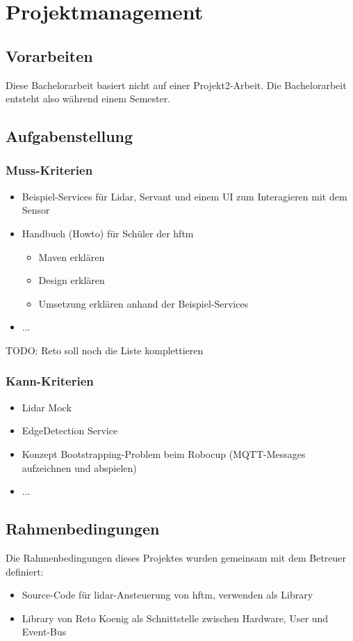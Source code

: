 \chapter{Projektmanagement}
\section{Vorarbeiten}
Diese Bachelorarbeit basiert nicht auf einer Projekt2-Arbeit. Die Bachelorarbeit entsteht also während einem Semester.

\section{Aufgabenstellung}
\label{sec:aufgabenstellung-messbar}
\subsection{Muss-Kriterien}
\begin{itemize}
	\item Beispiel-Services für Lidar, Servant und einem UI zum Interagieren mit dem Sensor
	\item Handbuch (Howto) für Schüler der \acrshort{hftm}
	\begin{itemize}
		\item Maven erklären
		\item Design erklären
		\item Umsetzung erklären anhand der Beispiel-Services
	\end{itemize}
	\item ...
\end{itemize}

TODO:
Reto soll noch die Liste komplettieren
\subsection{Kann-Kriterien}
\begin{itemize}
	\item Lidar Mock
	\item EdgeDetection Service
	\item Konzept Bootstrapping-Problem beim Robocup (MQTT-Messages aufzeichnen und abspielen)
	\item ...
\end{itemize}

\section{Rahmenbedingungen}
Die Rahmenbedingungen dieses Projektes wurden gemeinsam mit dem Betreuer definiert:
\begin{itemize}
	\item Source-Code für \acrshort{lidar}-Ansteuerung von \acrshort{hftm}, verwenden als Library
	\item Library  \cite{ch.quantasy.mqtt.gateway} von Reto Koenig als Schnittstelle zwischen Hardware, User und Event-Bus
\end{itemize}

